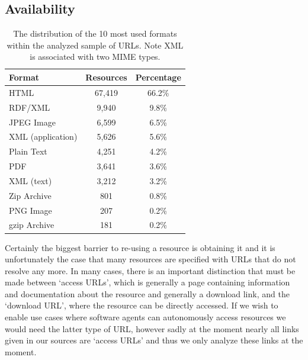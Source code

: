 \documentclass[smallextended]{svjour3}       %
\begin{document}
\subsection{Availability}

\begin{table}
    \begin{center}
	\begin{tabular}{lcc}
            \toprule
            Format   & Resources  & Percentage\\
            \midrule
                HTML                &	67,419 & 66.2\%\\
                RDF/XML             &	9,940  & 9.8\% \\
                JPEG Image          &   6,599  & 6.5\% \\
                XML (application)   &	5,626  & 5.6\% \\
                Plain Text          & 4,251    & 4.2\% \\
                PDF                 &	3,641  & 3.6\% \\
                XML (text)          & 3,212    & 3.2\% \\
                Zip Archive         &	801    & 0.8\% \\
                PNG Image           & 207      & 0.2\% \\
                gzip Archive        & 181      & 0.2\% \\
            \bottomrule
	\end{tabular}
    \end{center}
	\caption{\label{tab:formats}The distribution of the 10 most used formats within the
        analyzed sample of URLs. Note XML is associated with two MIME types.}
\end{table}

Certainly the biggest barrier to re-using a resource is obtaining it and it is
unfortunately the case that many resources are specified with URLs that do not
resolve any more. In many cases, there is an important distinction
that must be made between `access URLs', which is generally a page containing
information and documentation about the resource and generally a download link,
and the `download URL', where the resource can be directly accessed. If we wish
to enable use cases where software agents can autonomously access resources we
would need the latter type of URL, however sadly at the moment nearly all links
given in our sources are `access URLs' and thus we only analyze these links at
the moment.
\end{document}
